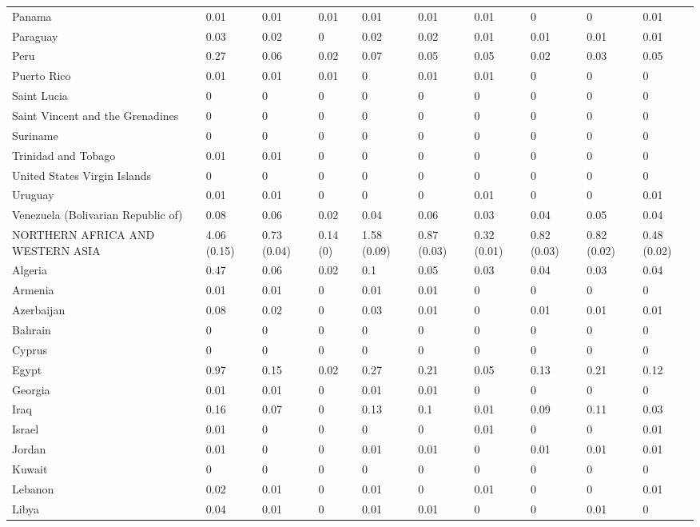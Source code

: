 \begin{longtable}[t]{llllllllll}
Panama & 0.01 & 0.01 & 0.01 & 0.01 & 0.01 & 0.01 & 0 & 0 & 0.01\\
Paraguay & 0.03 & 0.02 & 0 & 0.02 & 0.02 & 0.01 & 0.01 & 0.01 & 0.01\\
Peru & 0.27 & 0.06 & 0.02 & 0.07 & 0.05 & 0.05 & 0.02 & 0.03 & 0.05\\
Puerto Rico & 0.01 & 0.01 & 0.01 & 0 & 0.01 & 0.01 & 0 & 0 & 0\\
Saint Lucia & 0 & 0 & 0 & 0 & 0 & 0 & 0 & 0 & 0\\
Saint Vincent and the Grenadines & 0 & 0 & 0 & 0 & 0 & 0 & 0 & 0 & 0\\
Suriname & 0 & 0 & 0 & 0 & 0 & 0 & 0 & 0 & 0\\
Trinidad and Tobago & 0.01 & 0.01 & 0 & 0 & 0 & 0 & 0 & 0 & 0\\
United States Virgin Islands & 0 & 0 & 0 & 0 & 0 & 0 & 0 & 0 & 0\\
Uruguay & 0.01 & 0.01 & 0 & 0 & 0 & 0.01 & 0 & 0 & 0.01\\
Venezuela (Bolivarian Republic of) & 0.08 & 0.06 & 0.02 & 0.04 & 0.06 & 0.03 & 0.04 & 0.05 & 0.04\\
NORTHERN AFRICA AND WESTERN ASIA & 4.06 (0.15) & 0.73 (0.04) & 0.14 (0) & 1.58 (0.09) & 0.87 (0.03) & 0.32 (0.01) & 0.82 (0.03) & 0.82 (0.02) & 0.48 (0.02)\\
Algeria & 0.47 & 0.06 & 0.02 & 0.1 & 0.05 & 0.03 & 0.04 & 0.03 & 0.04\\
Armenia & 0.01 & 0.01 & 0 & 0.01 & 0.01 & 0 & 0 & 0 & 0\\
Azerbaijan & 0.08 & 0.02 & 0 & 0.03 & 0.01 & 0 & 0.01 & 0.01 & 0.01\\
Bahrain & 0 & 0 & 0 & 0 & 0 & 0 & 0 & 0 & 0\\
Cyprus & 0 & 0 & 0 & 0 & 0 & 0 & 0 & 0 & 0\\
Egypt & 0.97 & 0.15 & 0.02 & 0.27 & 0.21 & 0.05 & 0.13 & 0.21 & 0.12\\
Georgia & 0.01 & 0.01 & 0 & 0.01 & 0.01 & 0 & 0 & 0 & 0\\
Iraq & 0.16 & 0.07 & 0 & 0.13 & 0.1 & 0.01 & 0.09 & 0.11 & 0.03\\
Israel & 0.01 & 0 & 0 & 0 & 0 & 0.01 & 0 & 0 & 0.01\\
Jordan & 0.01 & 0 & 0 & 0.01 & 0.01 & 0 & 0.01 & 0.01 & 0.01\\
Kuwait & 0 & 0 & 0 & 0 & 0 & 0 & 0 & 0 & 0\\
Lebanon & 0.02 & 0.01 & 0 & 0.01 & 0 & 0.01 & 0 & 0 & 0.01\\
Libya & 0.04 & 0.01 & 0 & 0.01 & 0.01 & 0 & 0 & 0.01 & 0\\

\end{longtable}
